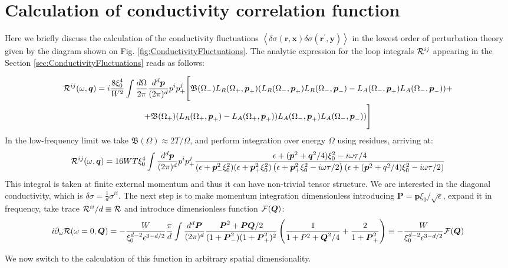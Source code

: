 \documentclass[twocolumn,english,prb]{revtex4-1}
\begin{document}
\section{Calculation of conductivity correlation function}
\label{sec:AppendixFluctuations}
Here we briefly discuss the calculation of the conductivity fluctuations $\left\langle \delta\sigma(\boldsymbol{r},\boldsymbol{x})\delta\sigma(\boldsymbol{r}^\prime,\boldsymbol{y})\right\rangle$ in the lowest order of perturbation theory given by the diagram shown on Fig. \ref{fig:ConductivityFluctuations}. The analytic expression for the loop integrals ${\cal R}^{i j}$ appearing in the Section \ref{sec:ConductivityFluctuations}  reads as follows:
\begin{widetext}
\begin{multline}
{\cal R}^{i j}(\omega,\boldsymbol{q})=i\frac{8\xi_{0}^{4}}{W^{2}}\int\frac{d\Omega}{2\pi}\frac{d^d\boldsymbol{p}}{(2\pi)^d}p^{i}p_{+}^{j}\Bigg[\mathfrak{B}(\Omega_{-})L_{R}(\Omega_{+},\boldsymbol{p}_{+})(L_{R}(\Omega_{-},\boldsymbol{p}_{+})L_{R}(\Omega_{-},\boldsymbol{p}_{-})-L_{A}(\Omega_{-},\boldsymbol{p}_{+})L_{A}(\Omega_{-},\boldsymbol{p}_{-}))+\\
+\mathfrak{B}(\Omega_{+})(L_{R}(\Omega_{+},\boldsymbol{p}_{+})-L_{A}(\Omega_{+},\boldsymbol{p}_{+}))L_{A}(\Omega_{-},\boldsymbol{p}_{+})L_{A}(\Omega_{-},\boldsymbol{p}_{-}))\Bigg]
\end{multline}
In the low-frequency limit we take $\mathfrak{B}(\Omega) \approx 2T / \Omega$, and perform integration over energy $\Omega$ using residues, arriving at:
\begin{equation}
{\cal R}^{i j}(\omega,\boldsymbol{q})=16WT\xi_{0}^{4}\int\frac{d^{d}\boldsymbol{p}}{(2\pi)^{d}}p^{i}p_{+}^{j}\frac{\epsilon+(\boldsymbol{p}^{2}+\boldsymbol{q}^{2}/4)\xi_{0}^{2}-i\omega\tau/4}{(\epsilon+\boldsymbol{p}_{-}^{2}\xi_{0}^{2})(\epsilon+\boldsymbol{p}_{+}^{2}\xi_{0}^{2})\left(\epsilon+\boldsymbol{p}_{+}^{2}\xi_{0}^{2}-i\omega\tau/2\right)\left(\epsilon+(\boldsymbol{p}^{2}+q^{2}/4)\xi_{0}^{2}-i\omega\tau/2\right)}
\end{equation}
This integral is taken at finite external momentum and thus it can have non-trivial tensor structure. We are interested in the diagonal conductivity, which is $\delta\sigma = \frac{1}{d}\sigma^{ii}$. The next step is to make momentum integration dimensionless introducing $\boldsymbol{P}=\boldsymbol{p}\xi_{0}/\sqrt{\epsilon}$, expand it in frequency, take trace ${\cal R}^{i i} / d\equiv {\cal R}$ and introduce dimensionless function ${\cal F}(\boldsymbol{Q})$:
\begin{equation}
i\partial_{\omega}{\cal R}(\omega=0,\boldsymbol{Q}) = -\frac{W}{\xi_{0}^{d-2}\epsilon^{3-d/2}}\frac{\pi}{d}\int\frac{d^{d}\boldsymbol{P}}{(2\pi)^{d}}\frac{\boldsymbol{P}^2 + \boldsymbol{P}\boldsymbol{Q}/2}{(1+\boldsymbol{P}_{-}^{2})(1+\boldsymbol{P}_{+}^{2})^{2}}\left(\frac{1}{1+P^{2}+\boldsymbol{Q}^{2}/4}+\frac{2}{1+\boldsymbol{P}_{+}^{2}}\right) \equiv -\frac{W}{\xi_{0}^{d-2}\epsilon^{3-d/2}} {\cal F}(\boldsymbol{Q})
\end{equation} 
\end{widetext}
We now switch to the calculation of this function in arbitrary spatial dimensionality.
\end{document}
